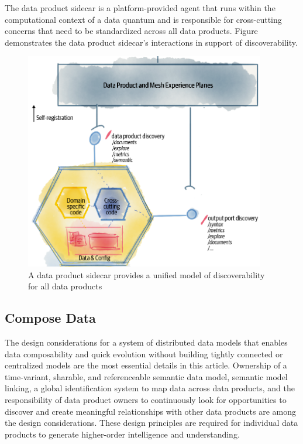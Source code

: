 \documentclass[12pt, a4paper]{book}
\begin{document}
The data product sidecar is a platform-provided agent that runs within the computational context of a data quantum and is responsible for cross-cutting concerns that need to be standardized across all data products. Figure demonstrates the data product sidecar’s interactions in support of discoverability. 

\begin{figure}[h]
	\begin{framed}
		\centering
		\includegraphics[width=10.5cm]{DiscoverData.png}
		\caption{A data product sidecar provides a unified model of discoverability for all data products}
		\label{DiscoverData}
	\end{framed}
\end{figure}
\vspace{-.3cm}
\subsection{Compose Data}
The design considerations for a system of distributed data models that enables data composability and quick evolution without building tightly connected or centralized models are the most essential details in this article. Ownership of a time-variant, sharable, and referenceable semantic data model, semantic model linking, a global identification system to map data across data products, and the responsibility of data product owners to continuously look for opportunities to discover and create meaningful relationships with other data products are among the design considerations. These design principles are required for individual data products to generate higher-order intelligence and understanding.
\end{document}
